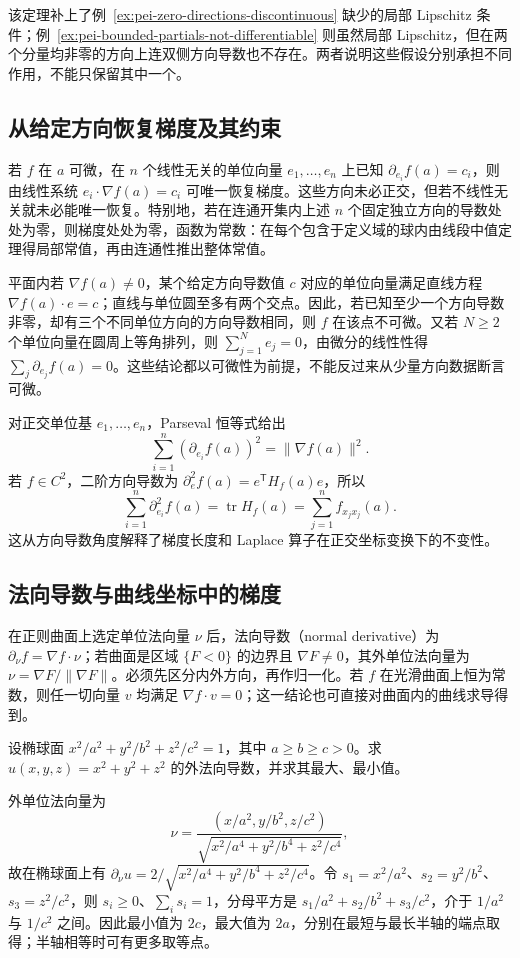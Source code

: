 该定理补上了例~\ref{ex:pei-zero-directions-discontinuous} 缺少的局部 Lipschitz 条件；例~\ref{ex:pei-bounded-partials-not-differentiable} 则虽然局部 Lipschitz，但在两个分量均非零的方向上连双侧方向导数也不存在。两者说明这些假设分别承担不同作用，不能只保留其中一个。

\subsection{从给定方向恢复梯度及其约束}

若 $f$ 在 $a$ 可微，在 $n$ 个线性无关的单位向量 $e_1,\ldots,e_n$ 上已知 $\partial_{e_i}f(a)=c_i$，则由线性系统 $e_i\cdot\nabla f(a)=c_i$ 可唯一恢复梯度。这些方向未必正交，但若不线性无关就未必能唯一恢复。特别地，若在连通开集内上述 $n$ 个固定独立方向的导数处处为零，则梯度处处为零，函数为常数：在每个包含于定义域的球内由线段中值定理得局部常值，再由连通性推出整体常值。

平面内若 $\nabla f(a)\ne0$，某个给定方向导数值 $c$ 对应的单位向量满足直线方程 $\nabla f(a)\cdot e=c$；直线与单位圆至多有两个交点。因此，若已知至少一个方向导数非零，却有三个不同单位方向的方向导数相同，则 $f$ 在该点不可微。又若 $N\ge2$ 个单位向量在圆周上等角排列，则 $\sum_{j=1}^N e_j=0$，由微分的线性性得 $\sum_j\partial_{e_j}f(a)=0$。这些结论都以可微性为前提，不能反过来从少量方向数据断言可微。

对正交单位基 $e_1,\ldots,e_n$，Parseval 恒等式给出
\[
\sum_{i=1}^n(\partial_{e_i}f(a))^2=\|\nabla f(a)\|^2.
\]
若 $f\in C^2$，二阶方向导数为 $\partial_e^2f(a)=e^{\mathsf T}H_f(a)e$，所以
\[
\sum_{i=1}^n\partial_{e_i}^2f(a)=\operatorname{tr}H_f(a)=\sum_{j=1}^n f_{x_jx_j}(a).
\]
这从方向导数角度解释了梯度长度和 Laplace 算子在正交坐标变换下的不变性。

\subsection{法向导数与曲线坐标中的梯度}

在正则曲面上选定单位法向量 $\nu$ 后，法向导数（normal derivative）为 $\partial_\nu f=\nabla f\cdot\nu$；若曲面是区域 $\{F<0\}$ 的边界且 $\nabla F\ne0$，其外单位法向量为 $\nu=\nabla F/\|\nabla F\|$。必须先区分内外方向，再作归一化。若 $f$ 在光滑曲面上恒为常数，则任一切向量 $v$ 均满足 $\nabla f\cdot v=0$；这一结论也可直接对曲面内的曲线求导得到。

\begin{example}
设椭球面 $x^2/a^2+y^2/b^2+z^2/c^2=1$，其中 $a\ge b\ge c>0$。求 $u(x,y,z)=x^2+y^2+z^2$ 的外法向导数，并求其最大、最小值。
\end{example}
\begin{solve}
外单位法向量为
\[
\nu=\frac{(x/a^2,y/b^2,z/c^2)}{\sqrt{x^2/a^4+y^2/b^4+z^2/c^4}},
\]
故在椭球面上有 $\partial_\nu u=2/\sqrt{x^2/a^4+y^2/b^4+z^2/c^4}$。令 $s_1=x^2/a^2$、$s_2=y^2/b^2$、$s_3=z^2/c^2$，则 $s_i\ge0$、$\sum_i s_i=1$，分母平方是 $s_1/a^2+s_2/b^2+s_3/c^2$，介于 $1/a^2$ 与 $1/c^2$ 之间。因此最小值为 $2c$，最大值为 $2a$，分别在最短与最长半轴的端点取得；半轴相等时可有更多取等点。
\end{solve}

